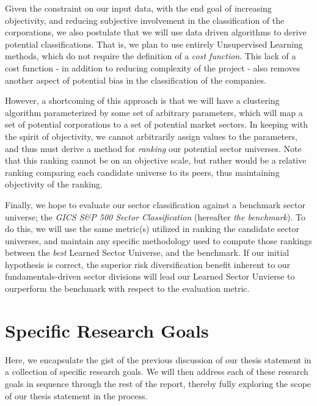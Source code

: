 \documentclass[../main.tex]{subfiles}
\begin{document}
Given the constraint on our input data, with the end goal of increasing objectivity, and reducing subjective involvement in the classification of the corporations, we also postulate that we will use data driven algorithms to derive potential classifications. That is, we plan to use entirely Unsupervised Learning methods, which do not require the definition of a \textit{cost function}. This lack of a cost function - in addition to reducing complexity of the project - also removes another aspect of potential bias in the classification of the companies.

However, a shortcoming of this approach is that we will have a clustering algorithm parameterized by some set of arbitrary parameters, which will map a set of potential corporations to a set of potential market sectors. In keeping with the spirit of objectivity, we cannot arbitrarily assign values to the parameters, and thus must derive a method for \textit{ranking} our potential sector universes. Note that this ranking cannot be on an objective scale, but rather would be a relative ranking comparing each candidate universe to its peers, thus maintaining objectivity of the ranking.

Finally, we hope to evaluate our sector classification against a benchmark sector universe; the \textit{GICS S\&P 500 Sector Classification} (hereafter \textit{the benchmark}). To do this, we will use the same metric(s) utilized in ranking the candidate sector universes, and maintain any specific methodology used to compute those rankings between the \textit{best} Learned Sector Universe, and the benchmark. If our initial hypothesis is correct, the superior risk diversification benefit inherent to our fundamentals-driven sector divisions will lead our Learned Sector Unvierse to ourperform the benchmark with respect to the evaluation metric.

\section{Specific Research Goals} \label{research_goals:specific_research_goals}

Here, we encapsulate the gist of the previous discussion of our thesis statement in a collection of specific research goals. We will then address each of these research goals in sequence through the rest of the report, thereby fully exploring the scope of our thesis statement in the process.

\vspace{2em}
\end{document}
